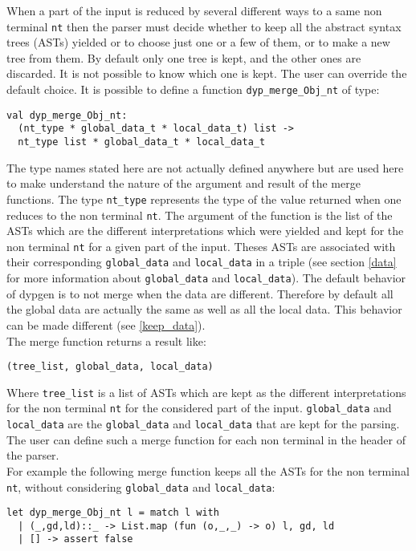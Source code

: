 \documentclass[12pt]{article}
\begin{document}
{When a part of the input is reduced by several different ways to a same non terminal \texttt{nt} then the parser must decide whether to keep all the abstract syntax trees (ASTs) yielded or to choose just one or a few of them, or to make a new tree from them. By default only one tree is kept, and the other ones are discarded. It is not possible to know which one is kept. The user can override the default choice. It is possible to define a function \verb|dyp_merge_Obj_nt| of type:
\begin{verbatim}
val dyp_merge_Obj_nt:
  (nt_type * global_data_t * local_data_t) list ->
  nt_type list * global_data_t * local_data_t
\end{verbatim}
The type names stated here are not actually defined anywhere but are used here to make understand the nature of the argument and result of the merge functions. The type \verb|nt_type| represents the type of the value returned when one reduces to the non terminal \verb|nt|.
The argument of the function is the list of the ASTs which are the different interpretations which were yielded and kept for the non terminal \verb|nt| for a given part of the input. Theses ASTs are associated with their corresponding \verb|global_data| and \verb|local_data| in a triple (see section \ref{data} for more information about \verb|global_data| and \verb|local_data|). The default behavior of dypgen is to not merge when the data are different. Therefore by default all the global data are actually the same as well as all the local data. This behavior can be made different (see \ref{keep_data}).\\

The merge function returns a result like:
\begin{verbatim}
(tree_list, global_data, local_data)
\end{verbatim}
Where \verb|tree_list| is a list of ASTs which are kept as the different interpretations for the non terminal \verb|nt| for the considered part of the input. \verb|global_data| and \verb|local_data| are the \verb|global_data| and \verb|local_data| that are kept for the parsing.\\

The user can define such a merge function for each non terminal in the header of the parser.\\

For example the following merge function keeps all the ASTs for the non terminal \verb|nt|, without considering \verb|global_data| and \verb|local_data|:
\begin{verbatim}
let dyp_merge_Obj_nt l = match l with
  | (_,gd,ld)::_ -> List.map (fun (o,_,_) -> o) l, gd, ld
  | [] -> assert false
\end{verbatim}

}
\end{document}
